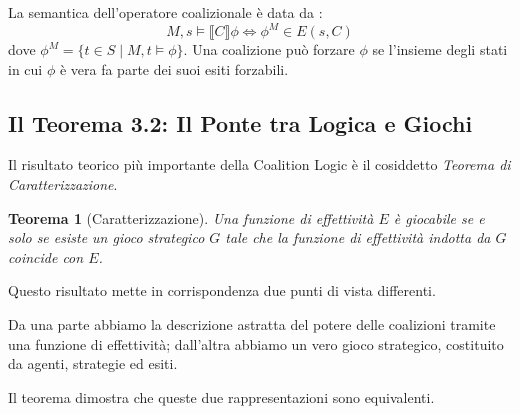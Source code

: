 \documentclass[12pt]{article}
\newcommand{\CL}[1]{\llbracket #1 \rrbracket}
\newtheorem{theorem}{Teorema}[section]
\begin{document}
La semantica dell'operatore coalizionale è data da :
\begin{equation}
	M, s \models \CL{C} \phi \iff \phi^M \in E(s, C)
\end{equation}
dove $\phi^M = \{t \in S \mid M, t \models \phi\}$. Una coalizione può forzare
$\phi$ se l'insieme degli stati in cui $\phi$ è vera fa parte dei suoi
esiti forzabili.

\subsection{Il Teorema 3.2: Il Ponte tra Logica e Giochi}

Il risultato teorico più importante della Coalition Logic è il cosiddetto
\emph{Teorema di Caratterizzazione}.

\begin{theorem}[Caratterizzazione]
	Una funzione di effettività $E$ è giocabile se e solo se esiste un gioco
	strategico $G$ tale che la funzione di effettività indotta da $G$ coincide
	con $E$.
\end{theorem}

Questo risultato mette in corrispondenza due punti di vista differenti.

Da una parte abbiamo la descrizione astratta del potere delle coalizioni
tramite una funzione di effettività; dall'altra abbiamo un vero gioco
strategico, costituito da agenti, strategie ed esiti.

Il teorema dimostra che queste due rappresentazioni sono equivalenti.
\end{document}
